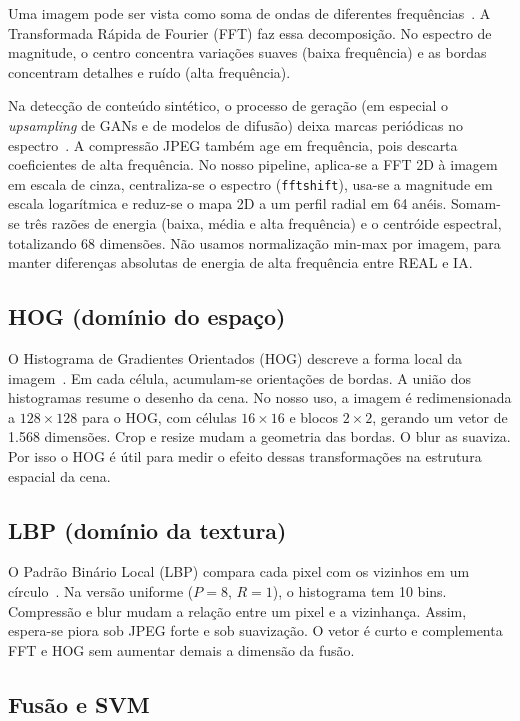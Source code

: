 \documentclass[12pt]{article}
\begin{document}
Uma imagem pode ser vista como soma de ondas de diferentes frequências~\cite{gonzalez2018}. A Transformada Rápida de Fourier (FFT) faz essa decomposição. No espectro de magnitude, o centro concentra variações suaves (baixa frequência) e as bordas concentram detalhes e ruído (alta frequência).

Na detecção de conteúdo sintético, o processo de geração (em especial o \emph{upsampling} de GANs e de modelos de difusão) deixa marcas periódicas no espectro~\cite{frank2020frequency,bammey2024synthbuster}. A compressão JPEG também age em frequência, pois descarta coeficientes de alta frequência. No nosso pipeline, aplica-se a FFT 2D à imagem em escala de cinza, centraliza-se o espectro (\texttt{fftshift}), usa-se a magnitude em escala logarítmica e reduz-se o mapa 2D a um perfil radial em 64 anéis. Somam-se três razões de energia (baixa, média e alta frequência) e o centróide espectral, totalizando 68 dimensões. Não usamos normalização min-max por imagem, para manter diferenças absolutas de energia de alta frequência entre REAL e IA.

\subsection{HOG (domínio do espaço)}

O Histograma de Gradientes Orientados (HOG) descreve a forma local da imagem~\cite{dalal2005hog}. Em cada célula, acumulam-se orientações de bordas. A união dos histogramas resume o desenho da cena. No nosso uso, a imagem é redimensionada a $128{\times}128$ para o HOG, com células $16{\times}16$ e blocos $2{\times}2$, gerando um vetor de 1{.}568 dimensões. Crop e resize mudam a geometria das bordas. O blur as suaviza. Por isso o HOG é útil para medir o efeito dessas transformações na estrutura espacial da cena.

\subsection{LBP (domínio da textura)}

O Padrão Binário Local (LBP) compara cada pixel com os vizinhos em um círculo~\cite{ojala2002lbp}. Na versão uniforme ($P{=}8$, $R{=}1$), o histograma tem 10 bins. Compressão e blur mudam a relação entre um pixel e a vizinhança. Assim, espera-se piora sob JPEG forte e sob suavização. O vetor é curto e complementa FFT e HOG sem aumentar demais a dimensão da fusão.

\subsection{Fusão e SVM}
\end{document}
